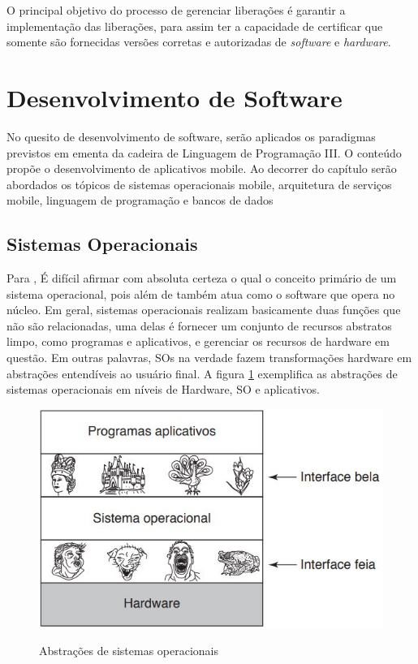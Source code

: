 O principal objetivo do processo de gerenciar liberações é garantir a implementação das liberações, para assim ter a capacidade de certificar que somente são fornecidas versões corretas e autorizadas de \textit{software} e \textit{hardware}.

\section{Desenvolvimento de Software}
No quesito de desenvolvimento de software, serão aplicados os paradigmas previstos em ementa da cadeira de Linguagem de Programação III. O conteúdo propõe o desenvolvimento de aplicativos mobile. Ao decorrer do capítulo serão abordados os tópicos de sistemas operacionais mobile, arquitetura de serviços mobile, linguagem de programação e bancos de dados
\pagebreak
\subsection{Sistemas Operacionais}
Para \citet{so_tanembaum}, É difícil afirmar com absoluta certeza o qual o conceito primário de um sistema operacional, pois além de também atua como o software que opera no núcleo. Em geral, sistemas operacionais realizam basicamente duas funções que não são relacionadas, uma delas é fornecer um conjunto de recursos abstratos limpo, como programas e aplicativos, e gerenciar os recursos de hardware em questão. Em outras palavras, SOs na verdade fazem transformações hardware em abstrações entendíveis ao usuário final. A figura \ref{fig:so_abstracoes} exemplifica as abstrações de sistemas operacionais em níveis de Hardware, SO e aplicativos.

\begin{figure}[htb]
     \caption {Abstrações de sistemas operacionais}
     \centering
     \begin{frame}{
     \includegraphics [scale=0.7,]{img/so_tanembaum.JPG}}
     \end{frame}
     \label{fig:so_abstracoes}
 \end{figure}

